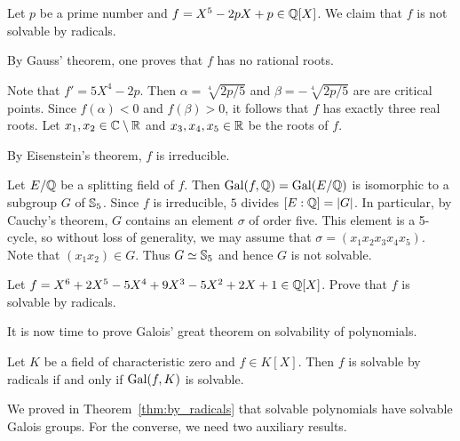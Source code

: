\begin{example}
    Let $p$ be a prime number and $f=X^5-2pX+p\in\mathbb{Q}[X]$. 
    We claim that 
    $f$ is not solvable by radicals. 
    
    By Gauss' theorem, one proves that $f$ has no rational roots. 

    Note that $f'=5X^4-2p$. Then $\alpha=\sqrt[4]{2p/5}$ and $\beta=-\sqrt[4]{2p/5}$ are
    are critical points. Since $f(\alpha)<0$ and $f(\beta)>0$, it follows that $f$ has
    exactly three real roots. Let 
    $x_1,x_2\in\mathbb{C}\setminus\mathbb{R}$ and $x_3,x_4,x_5\in\mathbb{R}$ be the roots
    of $f$. 
    
    By Eisenstein's theorem, $f$ is irreducible. 
    
    Let $E/\mathbb{Q}$ be a splitting field of $f$. 
    Then $\operatorname{Gal}(f,\mathbb{Q})=\operatorname{Gal}(E/\mathbb{Q})$ is isomorphic 
    to a subgroup $G$ of $\mathbb{S}_5$.
    Since 
    $f$ is irreducible, $5$ divides $[E:\mathbb{Q}]=|G|$. In particular, 
    by Cauchy's theorem, $G$ contains an element $\sigma$ of order five. This element
    is a 5-cycle, so without loss of generality, we may assume that 
    $\sigma=(x_1x_2x_3x_4x_5)$. Note that 
    $(x_1x_2)\in G$. Thus $G\simeq\mathbb{S}_5$ and hence
    $G$ is not solvable. 
\end{example}

\begin{exercise}
    Let $f=X^6+2X^5-5X^4+9X^3-5X^2+2X+1\in\mathbb{Q}[X]$. 
    Prove that $f$ is solvable by radicals. 
\end{exercise}



It is now time to prove Galois' great theorem on solvability 
of polynomials. 

\begin{theorem}[Galois]
\label{thm:Galois_great}
    Let $K$ be a field of characteristic zero and $f\in K[X]$. 
    Then $f$ is solvable by radicals if and only if $\operatorname{Gal}(f,K)$ is solvable. 
\end{theorem}

We proved in Theorem~\ref{thm:by_radicals} that solvable 
polynomials have solvable Galois groups. 
For the converse, we need two auxiliary results. 

